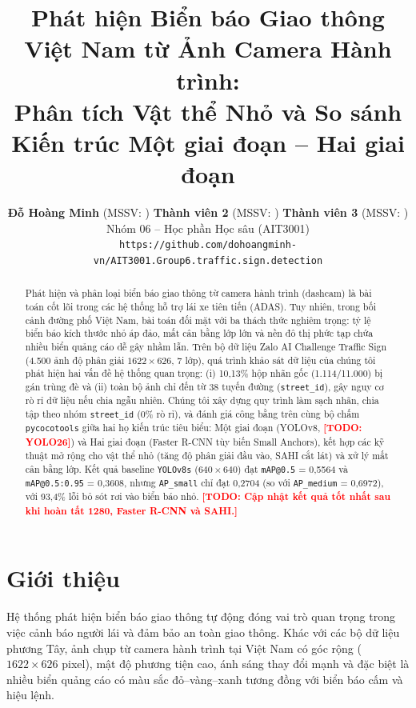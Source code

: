 \documentclass[11pt]{article}
\title{Phát hiện Biển báo Giao thông Việt Nam từ Ảnh Camera Hành trình:\\Phân tích Vật thể Nhỏ và So sánh Kiến trúc Một giai đoạn -- Hai giai đoạn}
\author{
  \textbf{Đỗ Hoàng Minh} (MSSV: \todo{MSSV1}) \quad
  \textbf{Thành viên 2} (MSSV: \todo{MSSV2}) \quad
  \textbf{Thành viên 3} (MSSV: \todo{MSSV3}) \\
  Nhóm 06 -- Học phần Học sâu (AIT3001) \\
  \texttt{https://github.com/dohoangminh-vn/AIT3001.Group6.traffic.sign.detection}
}
\newcommand{\todo}[1]{\textcolor{red}{\textbf{[TODO: #1]}}}
\begin{document}
\maketitle

\begin{abstract}
Phát hiện và phân loại biển báo giao thông từ camera hành trình (dashcam) là bài toán cốt lõi trong các hệ thống hỗ trợ lái xe tiên tiến (ADAS). Tuy nhiên, trong bối cảnh đường phố Việt Nam, bài toán đối mặt với ba thách thức nghiêm trọng: tỷ lệ biển báo kích thước nhỏ áp đảo, mất cân bằng lớp lớn và nền đô thị phức tạp chứa nhiều biển quảng cáo dễ gây nhầm lẫn. Trên bộ dữ liệu Zalo AI Challenge Traffic Sign (4.500 ảnh độ phân giải $1622\times 626$, 7 lớp), quá trình khảo sát dữ liệu của chúng tôi phát hiện hai vấn đề hệ thống quan trọng: (i) 10,13\% hộp nhãn gốc (1.114/11.000) bị gán trùng đè và (ii) toàn bộ ảnh chỉ đến từ 38 tuyến đường (\texttt{street\_id}), gây nguy cơ rò rỉ dữ liệu nếu chia ngẫu nhiên. Chúng tôi xây dựng quy trình làm sạch nhãn, chia tập theo nhóm \texttt{street\_id} (0\% rò rỉ), và đánh giá công bằng trên cùng bộ chấm \texttt{pycocotools} giữa hai họ kiến trúc tiêu biểu: Một giai đoạn (YOLOv8, \todo{YOLO26}) và Hai giai đoạn (Faster R-CNN tùy biến Small Anchors), kết hợp các kỹ thuật mở rộng cho vật thể nhỏ (tăng độ phân giải đầu vào, SAHI cắt lát) và xử lý mất cân bằng lớp. Kết quả baseline \texttt{YOLOv8s} ($640\times 640$) đạt \texttt{mAP@0.5} = 0,5564 và \texttt{mAP@0.5:0.95} = 0,3608, nhưng \texttt{AP\_small} chỉ đạt 0,2704 (so với \texttt{AP\_medium} = 0,6972), với 93,4\% lỗi bỏ sót rơi vào biển báo nhỏ. \todo{Cập nhật kết quả tốt nhất sau khi hoàn tất 1280, Faster R-CNN và SAHI.}
\end{abstract}

\section{Giới thiệu}
\label{sec:intro}

Hệ thống phát hiện biển báo giao thông tự động đóng vai trò quan trọng trong việc cảnh báo người lái và đảm bảo an toàn giao thông. Khác với các bộ dữ liệu phương Tây, ảnh chụp từ camera hành trình tại Việt Nam có góc rộng ($1622\times 626$ pixel), mật độ phương tiện cao, ánh sáng thay đổi mạnh và đặc biệt là nhiều biển quảng cáo có màu sắc đỏ--vàng--xanh tương đồng với biển báo cấm và hiệu lệnh.
\end{document}
